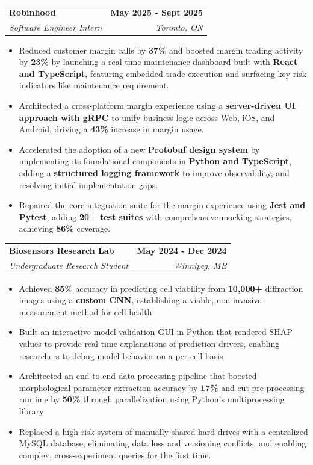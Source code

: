 \documentclass[11pt]{article}
\makeatletter
\newcommand{\resumeItem}[1]{
  \item\small{
    {\fontfamily{lmss}#1 \vspace{-2pt}}
  }
}
\newcommand{\resumeSubheadingUpd}[4]{
  \vspace{2pt}\item
    \begin{tabular*}{0.95\textwidth}[t]{l@{\extracolsep{\fill}}r}
      \hspace{1.2em}\textbf{#1} & {\bfseries #2} \\
      \hspace{1.25em}\textit{\small#3} & \textit{\small#4}
    \end{tabular*}\vspace{-7pt}
}
\newcommand{\resumeItemListStart}{\begin{itemize}}
\newcommand{\resumeItemListEnd}{\end{itemize}\vspace{-5pt}}
\makeatother
\begin{document}
    \resumeSubheadingUpd{Robinhood}{May 2025 - Sept 2025}{Software Engineer Intern}{Toronto, ON}
      \vspace{0.3em}
      \resumeItemListStart
        \resumeItem{Reduced customer margin calls by \textbf{37\%} and boosted margin trading activity by \textbf{23\%} by launching a real-time maintenance dashboard built with \textbf{React and TypeScript}, featuring embedded trade execution and surfacing key risk indicators like maintenance requirement.}
        \resumeItem{Architected a cross-platform margin experience using a \textbf{server-driven UI approach with gRPC} to unify business logic across Web, iOS, and Android, driving a \textbf{43\%} increase in margin usage.}
        \resumeItem{Accelerated the adoption of a new \textbf{Protobuf design system} by implementing its foundational components in \textbf{Python and TypeScript}, adding a \textbf{structured logging framework} to improve observability, and resolving initial implementation gaps.}
        \resumeItem{Repaired the core integration suite for the margin experience using \textbf{Jest and Pytest}, adding \textbf{20+ test suites} with comprehensive mocking strategies, achieving \textbf{86\%} coverage.}
      \resumeItemListEnd

    \resumeSubheadingUpd{Biosensors Research Lab}{May 2024 - Dec 2024}{Undergraduate Research Student}{Winnipeg, MB}
      \vspace{0.3em}
      \resumeItemListStart
        \resumeItem{Achieved \textbf{85\%} accuracy in predicting cell viability from \textbf{10,000+} diffraction images using a \textbf{custom CNN}, establishing a viable, non-invasive measurement method for cell health}
        \resumeItem{Built an interactive model validation GUI in Python that rendered SHAP values to provide real-time explanations of prediction drivers, enabling researchers to debug model behavior on a per-cell basis}
        \resumeItem{Architected an end-to-end data processing pipeline that boosted morphological parameter extraction accuracy by \textbf{17\%} and cut pre-processing runtime by \textbf{50\%} through parallelization using Python's multiprocessing library}
        \resumeItem{Replaced a high-risk system of manually-shared hard drives with a centralized MySQL database, eliminating data loss and versioning conflicts, and enabling complex, cross-experiment queries for the first time.}
      \resumeItemListEnd
\end{document}
